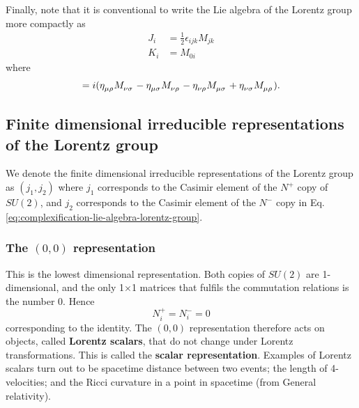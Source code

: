 \documentclass[11pt]{article}
\numberwithin{equation}{section}
\newcommand{\tn}[2]{\tensor{#1}{#2}}
\begin{document}
Finally, note that it is conventional to write the Lie algebra of the Lorentz group more compactly as 
\begin{align}
J_i &= \frac{1}{2} \epsilon_{ijk} M_{jk} \\
K_i &= M_{0i} 
\end{align}
where
\begin{equation}
[\tn{M}{_\mu_\nu},\tn{M}{_\rho_\sigma}] = i(\tn{\eta}{_\mu _\rho} \tn{M}{_\nu _\sigma} - \tn{\eta}{_\mu _\sigma} \tn{M}{_\nu _\rho} - \tn{\eta}{_\nu _\rho} \tn{M}{_\mu _\sigma} + \tn{\eta}{_\nu _\sigma} \tn{M}{_\mu _\rho}).
\end{equation}

\subsection{Finite dimensional irreducible representations of the Lorentz group}
We denote the finite dimensional irreducible representations of the Lorentz group as $(j_1, j_2)$ where $j_1$ corresponds to the Casimir element of the $N^+$ copy of $SU(2)$, and $j_2$ corresponds to the Casimir element of the $N^-$ copy in Eq.\eqref{eq:complexification-lie-algebra-lorentz-group}.

\subsubsection{The $(0,0)$ representation}
This is the lowest dimensional representation. Both copies of $SU(2)$ are 1-dimensional, and the only 1$\times$1 matrices that fulfils the commutation relations is the number 0. Hence
\begin{equation}
N_i^+ = N_i^- = 0
\end{equation}
corresponding to the identity. The $(0,0)$ representation therefore acts on objects, called \textbf{Lorentz scalars}, that do not change under Lorentz transformations. This is called the \textbf{scalar representation}. Examples of Lorentz scalars turn out to be spacetime distance between two events; the length of 4-velocities; and the Ricci curvature in a point in spacetime (from General relativity). 
\end{document}
